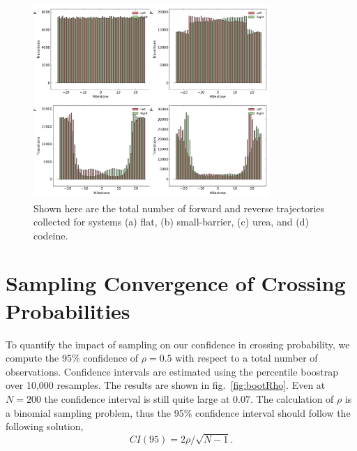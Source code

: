 \documentclass[usetitle=true,journal=jpcbfk,manuscript=suppinfo]{achemso}
\begin{document}
        \begin{figure}[htbp]
        \begin{center}
            \includegraphics[width=0.8\textwidth]{Figures/transitions}
            \caption{Shown here are the total number of forward and reverse trajectories collected for systems (a) flat, (b) small-barrier, (c) urea, and (d) codeine.}
            \label{fig:transitions}
        \end{center}
        \end{figure}

    \section*{Sampling Convergence of Crossing Probabilities}
        \par To quantify the impact of sampling on our confidence in crossing probability, we compute the 95\% confidence of $\rho=0.5$ with respect to a total number of observations. Confidence intervals are estimated using the percentile boostrap over 10,000 resamples. The results are shown in fig.~\ref{fig:bootRho}. Even at $N=200$ the confidence interval is still quite large at $0.07$. The calculation of $\rho$ is a binomial sampling problem, thus the 95\% confidence interval should follow the following solution,
        \begin{equation}
            CI(95) = 2\rho/\sqrt{N-1}.
        \end{equation}
\end{document}
